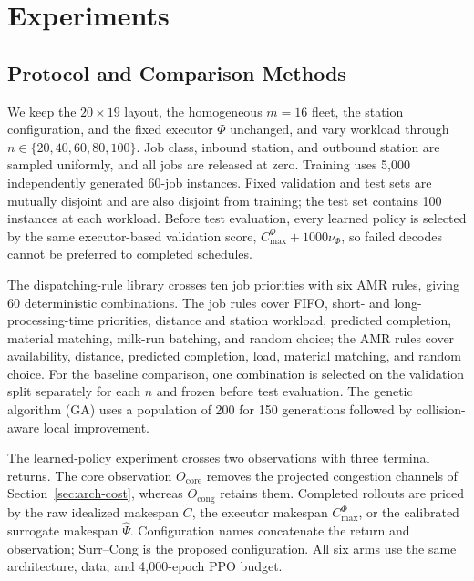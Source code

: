 
\section{Experiments}
\label{sec:experiments}

\subsection{Protocol and Comparison Methods}

We keep the $20\times19$ layout, the homogeneous $m=16$ fleet, the station
configuration, and the fixed executor $\Phi$ unchanged, and vary workload
through $n\in\{20,40,60,80,100\}$. Job class, inbound station, and outbound
station are sampled uniformly, and all jobs are released at zero. Training uses
5,000 independently generated 60-job instances. Fixed validation and test sets
are mutually disjoint and are also disjoint from training; the test set contains
100 instances at each workload. Before test evaluation, every learned policy is
selected by the same executor-based validation score,
$C_{\max}^{\Phi}+1000\nu_\Phi$, so failed decodes cannot be preferred to
completed schedules.

The dispatching-rule library crosses ten job priorities with six AMR rules,
giving 60 deterministic combinations. The job rules cover FIFO, short- and
long-processing-time priorities, distance and station workload, predicted
completion, material matching, milk-run batching, and random choice; the AMR
rules cover availability, distance, predicted completion, load, material
matching, and random choice. For the baseline comparison, one combination is
selected on the validation split separately for each $n$ and frozen before test
evaluation. The genetic algorithm (GA) uses a population of 200 for 150
generations followed by collision-aware local improvement.

The learned-policy experiment crosses two observations with three terminal
returns. The core observation $O_{\mathrm{core}}$ removes the projected
congestion channels of Section~\ref{sec:arch-cost}, whereas
$O_{\mathrm{cong}}$ retains them. Completed rollouts are priced by the raw
idealized makespan $\widetilde C$, the executor makespan $C_{\max}^{\Phi}$, or
the calibrated surrogate makespan $\hat\Psi$. Configuration names concatenate
the return and observation; Surr--Cong is the proposed configuration. All six
arms use the same architecture, data, and 4,000-epoch PPO budget.

